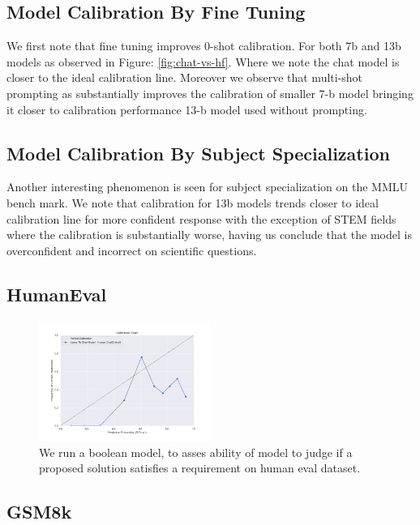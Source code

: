 \documentclass[11pt]{article}
\begin{document}
\subsection{Model Calibration By Fine Tuning}  

We first note that fine tuning improves 0-shot calibration. For both 7b and 13b models as observed in 
Figure: \ref{fig:chat-vs-hf}. Where we note the chat model is closer to the ideal calibration line. Moreover we observe that 
multi-shot prompting as substantially improves the calibration of smaller 7-b model bringing it closer to calibration performance 13-b model used without prompting.


\subsection{Model Calibration By Subject Specialization}  

Another interesting phenomenon is seen for subject specialization on the MMLU bench mark. We note that calibration for 13b models  trends closer to ideal calibration line for more confident response with the exception of STEM fields where the calibration is substantially worse, having us conclude that the model 
is overconfident and incorrect on scientific questions.




\subsection{HumanEval}

\begin{figure}
  \includegraphics[width=0.5\textwidth]{figures/0-shot-7b-human-eval.png}
  \caption{We run a boolean model, to asses ability of model to judge if a proposed solution satisfies a requirement on human eval dataset.}
  \label{fig:human-eval-results}
\end{figure}

\subsection{GSM8k}
\end{document}
